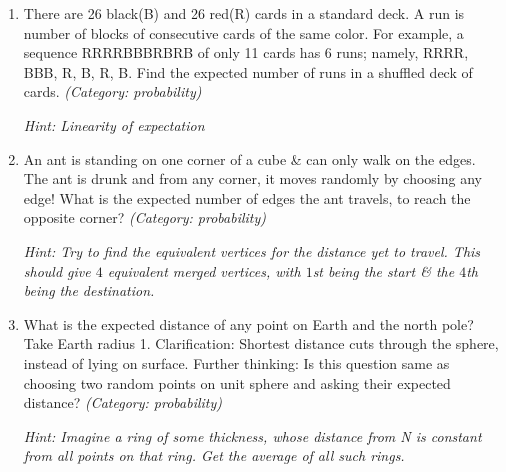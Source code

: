 \begin{enumerate}

\item There are 26 black(B) and 26 red(R) cards in a standard deck. A run is number of blocks of consecutive cards of the same color. For example, a sequence RRRRBBBRBRB of only 11 cards has 6 runs; namely, RRRR, BBB, R, B, R, B. Find the expected number of runs in a shuffled deck of cards.
\small\emph{(Category: probability)}

\small\emph{Hint: Linearity of expectation}





\item An ant is standing on one corner of a cube \& can only walk on the edges. The ant is drunk and from any corner, it moves randomly by choosing any edge! What is the expected number of edges the ant travels, to reach the opposite corner?
\small\emph{(Category: probability)}

\small\emph{Hint: Try to find the equivalent vertices for the distance yet to travel. This should give $4$ equivalent merged vertices, with $1$st being the start \& the $4$th being the destination.}





\item What is the expected distance of any point on Earth and the north pole? Take Earth radius 1.
Clarification: Shortest distance cuts through the sphere, instead of lying on surface.
Further thinking: Is this question same as choosing two random points on unit sphere and asking their expected distance?
\small\emph{(Category: probability)}

\small\emph{Hint: Imagine a ring of some thickness, whose distance from N is constant from all points on that ring. Get the average of all such rings.}






\end{enumerate}
